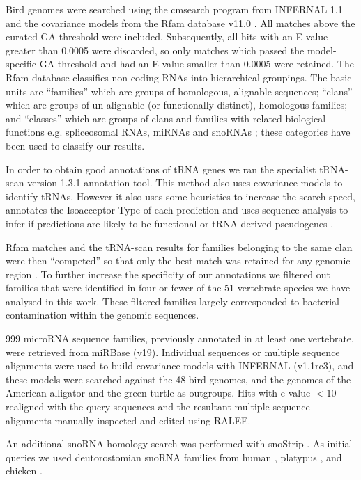 \documentclass[10pt]{bmc_article}
\newenvironment{bmcformat}{\begin{raggedright}\baselineskip20pt\sloppy\setboolean{publ}{false}}{\end{raggedright}\baselineskip20pt\sloppy}
\begin{document}
\begin{bmcformat}
Bird genomes were searched using the cmsearch program from INFERNAL
1.1 and the covariance models from the Rfam database
v11.0 \cite{Gardner:2011a,Burge:2013}. All matches above the curated GA
threshold were included. Subsequently, all hits with an E-value
greater than 0.0005 were discarded, so only matches which passed the
model-specific GA threshold and had an E-value smaller than 0.0005
were retained. The Rfam database classifies non-coding RNAs into
hierarchical groupings. The basic units are ``families'' which are
groups of homologous, alignable sequences; ``clans'' which are groups
of un-alignable (or functionally distinct), homologous families; and
``classes'' which are groups of clans and families with related
biological functions e.g. spliceosomal RNAs, miRNAs and snoRNAs
\cite{Griffiths-Jones:2003,Griffiths-Jones:2005,Gardner:2009,Gardner:2011a,Burge:2013};
these categories have been used to classify our results.

In order to obtain good annotations of tRNA genes we ran the
specialist tRNA-scan version 1.3.1 annotation tool. This method also
uses covariance models to identify tRNAs. However it also uses some
heuristics to increase the search-speed, annotates the Isoacceptor
Type of each prediction and uses sequence analysis to infer if
predictions are likely to be functional or tRNA-derived pseudogenes
\cite{Lowe:1997,Chan:2009}.

Rfam matches and the tRNA-scan results for families belonging to the
same clan were then ``competed'' so that only the best match was
retained for any genomic region \cite{Gardner:2011a}.  To further
increase the specificity of our annotations we filtered out families
that were identified in four or fewer of the 51 vertebrate species we
have analysed in this work. These filtered families largely
corresponded to bacterial contamination within the genomic sequences.

999 microRNA sequence families, previously annotated in at least one
vertebrate, were retrieved from miRBase (v19). Individual sequences or
multiple sequence alignments were used to build covariance models with
INFERNAL (v1.1rc3), and these models were searched against the 48 bird
genomes, and the genomes of the American alligator and the green
turtle as outgroups. Hits with e-value $<10$ realigned with the query
sequences and the resultant multiple sequence alignments manually
inspected and edited using RALEE.

An additional snoRNA homology search was performed with snoStrip
\cite{Bartschat:2013}. As initial queries we used deutorostomian
snoRNA families from human \cite{Lestrade:2006}, platypus
\cite{Schmitz:2008}, and chicken \cite{Shao:2009}.


\end{bmcformat}
\end{document}
